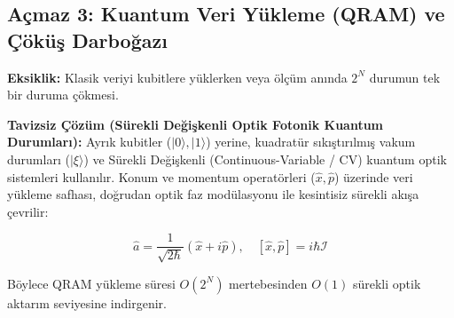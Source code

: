 \documentclass[11pt, a4paper]{article}
\begin{document}
\subsection{Açmaz 3: Kuantum Veri Yükleme (QRAM) ve Çöküş Darboğazı}
\textbf{Eksiklik:} Klasik veriyi kubitlere yüklerken veya ölçüm anında $2^N$ durumun tek bir duruma çökmesi.

\textbf{Tavizsiz Çözüm (Sürekli Değişkenli Optik Fotonik Kuantum Durumları):} Ayrık kubitler ($|0\rangle, |1\rangle$) yerine, kuadratür sıkıştırılmış vakum durumları ($|\xi\rangle$) ve Sürekli Değişkenli (Continuous-Variable / CV) kuantum optik sistemleri kullanılır. Konum ve momentum operatörleri ($\hat{x}, \hat{p}$) üzerinde veri yükleme safhası, doğrudan optik faz modülasyonu ile kesintisiz sürekli akışa çevrilir:

\begin{equation}
\hat{a} = \frac{1}{\sqrt{2\hbar}}(\hat{x} + i\hat{p}), \quad [\hat{x}, \hat{p}] = i\hbar \mathcal{I}
\end{equation}

Böylece QRAM yükleme süresi $O(2^N)$ mertebesinden $O(1)$ sürekli optik aktarım seviyesine indirgenir.
\end{document}
